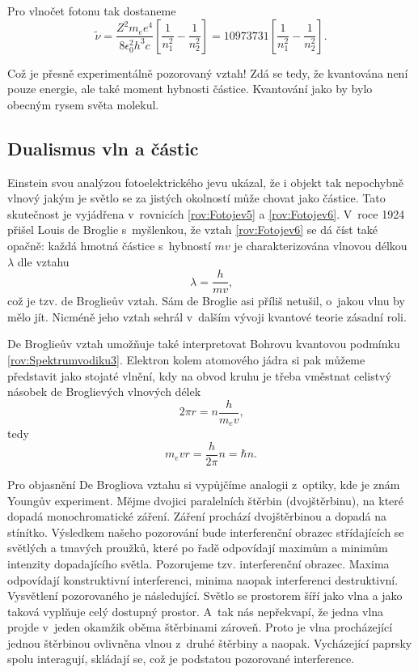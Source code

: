 \noindent Pro vlnočet fotonu tak dostaneme
\begin{equation}
\tilde{\nu} = \frac{Z^2m_e e^4}{8\epsilon_0^2 h^3c}\left[ \frac{1}{n_1^2} - \frac{1}{n_2^2} \right ] = 10973731 \left[ \frac{1}{n_1^2} - \frac{1}{n_2^2} \right ].
\label{rov:Spektrumvodiku9}
\end{equation}

\noindent Což je přesně experimentálně pozorovaný vztah! Zdá se tedy, že kvantována není pouze energie, ale také moment hybnosti částice. Kvantování jako by bylo obecným rysem světa molekul. 

\subsection{Dualismus vln a částic}

Einstein svou analýzou fotoelektrického jevu ukázal, že i objekt tak nepochybně vlnový jakým je světlo se za jistých okolností může chovat jako částice. Tato skutečnost je vyjádřena v~rovnicích \ref{rov:Fotojev5} a \ref{rov:Fotojev6}. V~roce 1924 přišel Louis de Broglie s~myšlenkou, že vztah \ref{rov:Fotojev6} se dá číst také opačně: každá hmotná částice s~hybností $mv$ je charakterizována vlnovou délkou $\lambda$ dle vztahu
\begin{equation}
\boxed{\lambda = \frac{h}{mv}\mbox{,}}
\label{rov:Dualismus1}
\end{equation}
\noindent což je tzv. de Broglieův vztah. Sám de Broglie asi příliš netušil, o~jakou vlnu by mělo jít. Nicméně jeho vztah sehrál v~dalším vývoji kvantové teorie zásadní roli. 

De Broglieův vztah umožňuje také interpretovat Bohrovu kvantovou podmínku \ref{rov:Spektrumvodiku3}. Elektron kolem atomového jádra si pak můžeme představit jako stojaté vlnění, kdy na obvod kruhu je třeba vměstnat celistvý násobek de Broglievých vlnových délek
\begin{equation}
2\pi r = n \frac{h}{m_e v}\mbox{,}
\label{Dualismus2}
\end{equation}
tedy
\begin{equation}
m_e vr = \frac{h}{2\pi}n = \hbar n \mbox{.}
\label{Dualismus3}
\end{equation}

Pro objasnění De Brogliova vztahu si vypůjčíme analogii z~optiky, kde je znám Youngův experiment. Mějme dvojici paralelních štěrbin (dvojštěrbinu), na které dopadá monochromatické záření. Záření prochází dvojštěrbinou a  dopadá na stínítko. Výsledkem našeho pozorování bude interferenční obrazec střídajících se světlých a tmavých proužků, které po řadě odpovídají maximům a minimům intenzity dopadajícího světla. Pozorujeme tzv. interferenční obrazec. Maxima odpovídají konstruktivní interferenci, minima naopak interferenci destruktivní. Vysvětlení pozorovaného je následující. Světlo se prostorem šíří jako vlna a jako taková vyplňuje celý dostupný prostor. A~tak nás nepřekvapí, že jedna vlna projde v~jeden okamžik oběma štěrbinami zároveň. Proto je vlna procházející jednou štěrbinou ovlivněna vlnou z~druhé štěrbiny a naopak. Vycházející paprsky spolu interagují, skládají se, což je podstatou pozorované interference.


